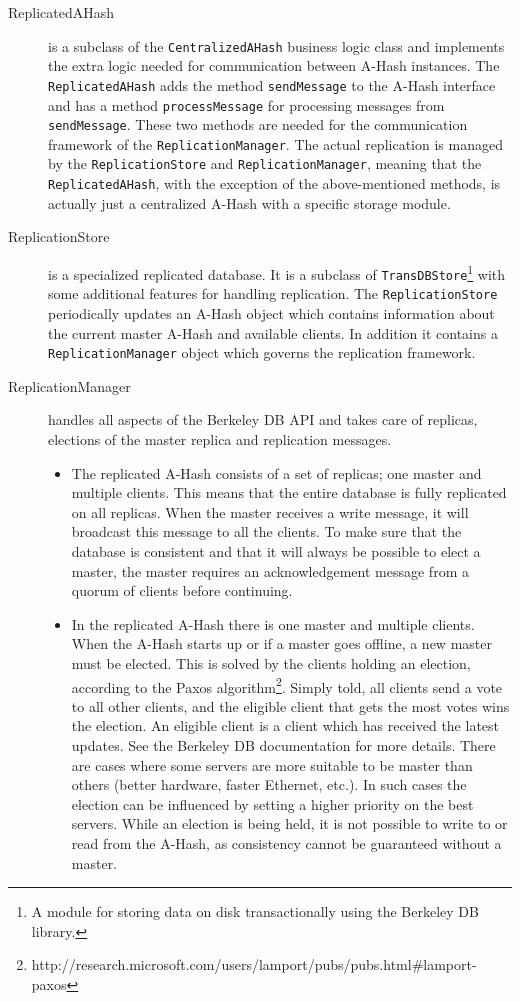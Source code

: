 \documentclass{book}
\begin{document}
\begin{description}
    \item[ReplicatedAHash] 
	is a subclass of the \verb!CentralizedAHash! business logic class and implements the extra logic needed for communication between A-Hash instances. The \verb!ReplicatedAHash! adds the method \verb!sendMessage! to the A-Hash interface and has a method \verb!processMessage! for processing messages from \verb!sendMessage!. These two methods are needed for the communication framework of the \verb!ReplicationManager!. The actual replication is managed by the \verb!ReplicationStore! and \verb!ReplicationManager!, meaning that the \verb!ReplicatedAHash!, with the exception of the above-mentioned methods, is actually just a centralized A-Hash with a specific storage module.
    \item[ReplicationStore] 
	is a specialized replicated database. It is a subclass of \verb!TransDBStore!\footnote{A module for storing data on disk transactionally using the Berkeley DB library.} with some additional features for handling replication. The \verb!ReplicationStore! periodically updates an A-Hash object which contains information about the current master A-Hash and available clients. In addition it contains a \verb!ReplicationManager! object which governs the replication framework.
    \item[ReplicationManager] 
	handles all aspects of the Berkeley DB API and takes care of replicas, elections of the master replica and replication messages.
	\begin{itemize}
	\item The replicated A-Hash consists of a set of replicas; one master and multiple clients. This means that the entire database is fully replicated on all replicas. When the master receives a write message, it will broadcast this message to all the clients. To make sure that the database is consistent and that it will always be possible to elect a master, the master requires an acknowledgement message from a quorum of clients before continuing.
	\item In the replicated A-Hash there is one master and multiple clients. When the A-Hash starts up or if a master goes offline, a new master must be elected. This is solved by the clients holding an election, according to the Paxos algorithm\footnote{http://research.microsoft.com/users/lamport/pubs/pubs.html\#lamport-paxos}. Simply told, all clients send a vote to all other clients, and the eligible client that gets the most votes wins the election. An eligible client is a client which has received the latest updates. See the Berkeley DB documentation for more details. There are cases where some servers are more suitable to be master than others (better hardware, faster Ethernet, etc.). In such cases the election can be influenced by setting a higher priority on the best servers. While an election is being held, it is not possible to write to or read from the A-Hash, as consistency cannot be guaranteed without a master.

\end{itemize}
\end{description}
\end{document}
